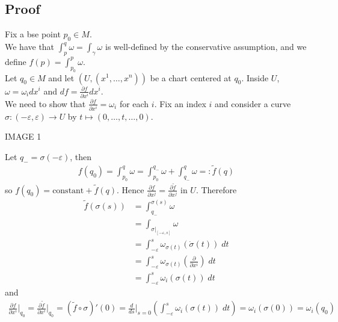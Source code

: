 \documentclass[11pt]{article}
\begin{document}
\subsection*{Proof}
\label{sec:orge58a145}
Fix a bse point \(p_{0}\in M\).\\
We have that \(\int_{p}^{q}\omega=\int_{\gamma}\omega\) is well-defined by the conservative assumption, and we define \(f(p)=\int_{p_{0}}^{p}\omega\).\\
Let \(q_{0}\in M\) and let \((U,(x^{1},\ldots,x^{n}))\) be a chart centered at \(q_{0}\). Inside \(U\), \(\omega=\omega_{i}dx^{i}\) and \(df=\frac{\partial f}{\partial x^{i}}dx^{i}\).\\
We need to show that \(\frac{\partial f}{\partial x^{i}}=\omega_{i}\) for each \(i\). Fix an index \(i\) and consider a curve \(\sigma:(-\varepsilon,\varepsilon)\to U\) by \(t\mapsto(0,\ldots,t,\ldots,0)\).\\
\begin{center}
IMAGE 1\\
\end{center}
Let \(q_{-}=\sigma(-\varepsilon)\), then\\
\begin{align*}
  f(q_{0})
  =\int_{p_{0}}^{q}\omega
  =\int_{p_{0}}^{q_{-}}\omega+\int_{q_{-}}^{q}\omega=:\tilde{f}(q)
\end{align*}
so \(f(q_{0})=\text{constant}+\tilde{f}(q)\). Hence \(\frac{\partial f}{\partial x^{j}}=\frac{\partial\tilde{f}}{\partial x^{j}}\) in \(U\). Therefore\\
\begin{align*}
  \tilde{f}(\sigma(s))
  &=\int_{q_{-}}^{\sigma(s)}\omega \\
  &=\int_{\sigma|_{[-\varepsilon,s]}}\omega \\
  &=\int_{-\varepsilon}^{s}\omega_{\sigma(t)}(\dot{\sigma}(t))\;dt \\
  &=\int_{-\varepsilon}^{s}\omega_{\sigma(t)}\left( \frac{\partial}{\partial x^{i}} \right)\;dt \\
  &=\int_{-\varepsilon}^{s}\omega_{i}(\sigma(t))\;dt
\end{align*}
and\\
\begin{align*}
  \frac{\partial f}{\partial x^{i}}\Big|_{q_{0}}
  =\frac{\partial\tilde{f}}{\partial x^{i}}\Big|_{q_{0}}
  =(\tilde{f}\circ\sigma)'(0)
  =\frac{d}{ds}\Big|_{s=0}\left( \int_{-\varepsilon}^{s}\omega_{i}(\sigma(t))\;dt \right)
  =\omega_{i}(\sigma(0))
  =\omega_{i}(q_{0})
\end{align*}
\end{document}

